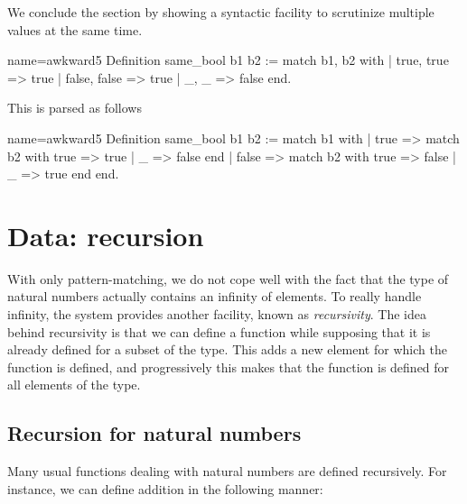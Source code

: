 We conclude the section by showing a syntactic facility to scrutinize
multiple values at the same time.

\begin{coq}{name=awkward5}{}
Definition same_bool b1 b2 :=
  match b1, b2 with
  | true, true => true
  | false, false => true
  | _, _ => false
  end.
\end{coq}

This is parsed as follows

\begin{coq}{name=awkward5}{}
Definition same_bool b1 b2 :=
  match b1 with
  | true => match b2 with true => true | _ => false end
  | false => match b2 with true => false | _ => true end
  end.
\end{coq}

\section{Data: recursion}

With only pattern-matching, we do not cope well with the fact that the
type  of natural numbers actually contains an infinity of
elements.  To really handle infinity, the \Coq{} system provides another
facility, known as {\em recursivity}.  The idea behind recursivity is
that we can define a function while supposing that it is already
defined for a subset of the type.  This adds a new element for which
the function is defined, and progressively this makes that the
function is defined for all elements of the type.
\subsection{Recursion for natural numbers}

Many usual functions dealing with natural numbers are
defined recursively.  For instance, we can define addition in the
following manner:

